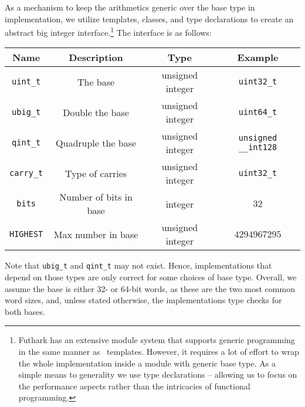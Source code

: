 As a mechanism to keep the arithmetics generic over the base type in
implementation, we utilize templates, classes, and type declarations to create
an abstract big integer interface.\footnote{Futhark has an extensive module
  system that supports generic programming in the same manner as \cpp\
  templates. However, it requires a lot of effort to wrap the whole
  implementation inside a module with generic base type. As a simple means to
  generality we use type declarations -- allowing us to focus on the performance
  aspects rather than the intricacies of functional programming.} The interface
is as follows:
\begin{center}
  \begin{tabular}{cccc}
    Name & Description & Type & Example\\
    \hline
    \texttt{uint\_t} & The base & unsigned integer & \texttt{uint32\_t}\\
    \texttt{ubig\_t} & Double the base & unsigned integer & \texttt{uint64\_t}\\
    \texttt{qint\_t} & Quadruple the base & unsigned integer & \texttt{unsigned \_\_int128}\\
    \texttt{carry\_t} & Type of carries & unsigned integer & \texttt{uint32\_t}\\
    \texttt{bits} & Number of bits in base & integer & $32$\\
    \texttt{HIGHEST} & Max number in base & unsigned integer & $4294967295$\\
  \end{tabular}
  \end{center}
  Note that \texttt{ubig\_t} and \texttt{qint\_t} may not exist. Hence,
  implementations that depend on those types are only correct for some choices
  of base type. Overall, we assume the base is either 32- or 64-bit words, as
  these are the two most common word sizes, and, unless stated otherwise, the
  implementations type checks for both bases.

